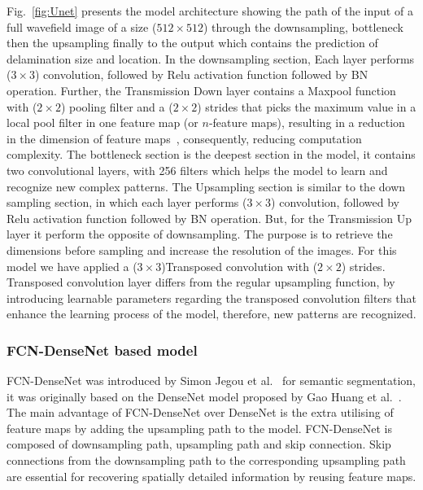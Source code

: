 \documentclass[preprint,9pt]{elsarticle}
\begin{document}
	Fig.~\ref{fig:Unet} presents the model architecture showing the path of the input of a full wavefield image of a size (\(512\times512\)) through the downsampling, bottleneck then the upsampling finally to the output which contains the prediction of delamination size and location. 
	In the downsampling section,
	Each layer performs (\(3\times3\)) convolution, followed by Relu activation function followed by BN operation.
	Further, the Transmission Down layer contains a Maxpool function with (\(2\times2\)) pooling filter and a (\(2\times2\)) strides that picks the maximum value in a local pool filter in one feature map (or \(n\)-feature maps), resulting in a reduction in the dimension of feature maps~\cite{Lecun2015}, consequently, reducing computation complexity.
	The bottleneck section is the deepest section in the model, it contains two convolutional layers, with 256 filters which helps the model to learn and recognize new complex patterns.
	The Upsampling section is similar to the down sampling section, in which each layer  performs (\(3\times3\)) convolution, followed by Relu activation function followed by BN operation. But, for the Transmission Up layer it perform the opposite of downsampling.
	The purpose is to retrieve the dimensions before sampling and increase the resolution of the images. 
	For this model we have applied a (\(3\times3\))Transposed convolution with (\(2\times2\)) strides.
	Transposed convolution layer differs from the regular upsampling function, by introducing learnable parameters regarding the transposed convolution filters that enhance the learning process of the model, therefore, new patterns are recognized. 
	\subsubsection{FCN-DenseNet based model}
	FCN-DenseNet was introduced by Simon Jegou et al.~\cite{Jegou} for semantic segmentation, it was originally based on the DenseNet model proposed by Gao Huang et al.~\cite{Huang}. 
	The main advantage of FCN-DenseNet over DenseNet is the extra utilising of feature maps by adding the upsampling path to the model.
	FCN-DenseNet is composed of downsampling path, upsampling path and skip connection.
	Skip connections from the downsampling path to the corresponding upsampling path are essential for recovering spatially detailed information by reusing feature maps.
 
\end{document}
